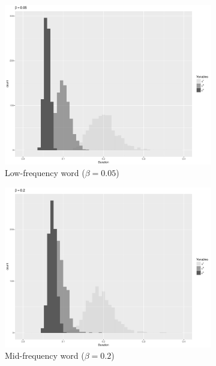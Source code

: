 \begin{figure}[h]
\begin{subfigure}[t]{.3\textwidth}
        \includegraphics[width=\linewidth]{figures/SpeakingRateFrequencybeta05.pdf}
        \caption{Low-frequency word ($\beta=0.05$)}
    \end{subfigure}\hfill
    \begin{subfigure}[t]{.3\textwidth}
        \includegraphics[width=\linewidth]{figures/SpeakingRateFrequencybeta2.pdf}
        \caption{Mid-frequency word ($\beta=0.2$)}
    \end{subfigure}\hfill
    \begin{subfigure}[t]{.3\textwidth}

\end{subfigure}
\end{figure}
